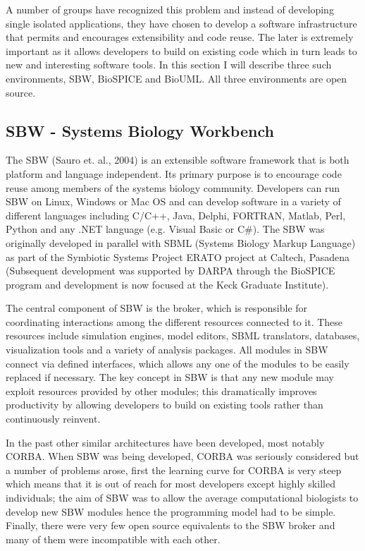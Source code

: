 \documentclass[12pt]{article}
\begin{document}
{A number of groups have recognized this problem and instead of
developing single isolated applications, they have chosen to
develop a software infrastructure that permits and encourages
extensibility and code reuse. The later is extremely important as
it allows developers to build on existing code which in turn leads
to new and interesting software tools. In this section I will
describe three such environments, SBW, BioSPICE and BioUML. All three
environments are open source.


\subsection{SBW - Systems Biology Workbench}

The SBW (Sauro et. al., 2004) is an extensible software framework
that is both platform and language independent. Its primary
purpose is to encourage code reuse among members of the systems
biology community. Developers can run SBW on Linux, Windows or Mac
OS and can develop software in a variety of different languages
including C/C++, Java, Delphi, FORTRAN, Matlab, Perl, Python and
any .NET language (e.g. Visual Basic or C\#). The SBW was originally
developed in parallel with SBML (Systems Biology Markup Language)
as part of the Symbiotic Systems Project ERATO project at Caltech,
Pasadena (Subsequent development was supported by DARPA through the BioSPICE program and development is now focused at the Keck Graduate Institute).

The central component of SBW is the broker, which is responsible for coordinating interactions among the different resources connected to it. These resources include simulation
engines, model editors, SBML translators, databases, visualization
tools and a variety of analysis packages. All modules in SBW
connect via defined interfaces, which allows any one of the
modules to be easily replaced if necessary. The key concept in SBW
is that any new module may exploit resources provided by other
modules; this dramatically improves productivity by allowing
developers to build on existing tools rather than continuously
reinvent.

In the past other similar architectures have been developed, most notably
CORBA. When SBW was being developed, CORBA was seriously considered but
a number of problems arose, first the learning curve for CORBA is very steep which
means that it is out of reach for most developers except highly skilled individuals;
the aim of SBW was to allow the average computational biologists to develop new SBW modules hence the programming model had to be simple. Finally, there were very few
open source equivalents to the SBW broker and many of them were incompatible with each other.


}
\end{document}
